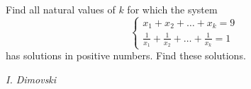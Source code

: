 Find all natural values of $k$ for which the system
$$\begin{cases}x_1+x_2+\ldots+x_k=9\\\frac1{x_1}+\frac1{x_2}+\ldots+\frac1{x_k}=1\end{cases}$$has solutions in positive numbers. Find these solutions.

\textit{I. Dimovski}